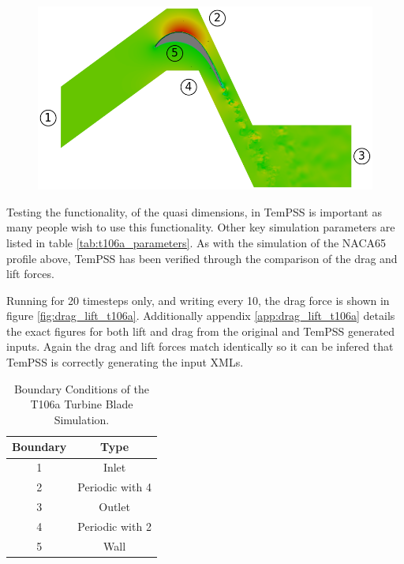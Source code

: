 \documentclass[11pt, a4paper]{report}
\begin{document}
\begin{figure}[htb!]
 \centering
 \includegraphics[width=.95\linewidth,  clip=true, trim = 0cm 0cm 0cm 0cm]{t106a_domain}
 \label{fig:t106a_domain}
\end{figure}

Testing the functionality, of the quasi dimensions, in TemPSS is important as many people wish to use this functionality. Other key simulation parameters are listed in table \ref{tab:t106a_parameters}. As with the simulation of the NACA65 profile above, TemPSS has been verified through the comparison of the drag and lift forces.

Running for 20 timesteps only, and writing every 10, the drag force is shown in figure \ref{fig:drag_lift_t106a}. Additionally appendix \ref{app:drag_lift_t106a}  details the exact figures for both lift and drag from the original and TemPSS generated inputs. Again the drag and lift forces match identically so it can be infered that TemPSS is correctly generating the input XMLs.
\begin{table}[htb!]
	\centering
    \begin{tabular}{ c || c }
    \hline
    Boundary & Type \\
    \hline
    1 & Inlet \\
    2 & Periodic with 4\\
    3 & Outlet\\
    4 & Periodic with 2\\
    5 & Wall\\
    \hline
    \end{tabular}
    \caption{Boundary Conditions of the T106a Turbine Blade Simulation.}
    \label{tab:t106a_boundaries}
\end{table}
\end{document}
